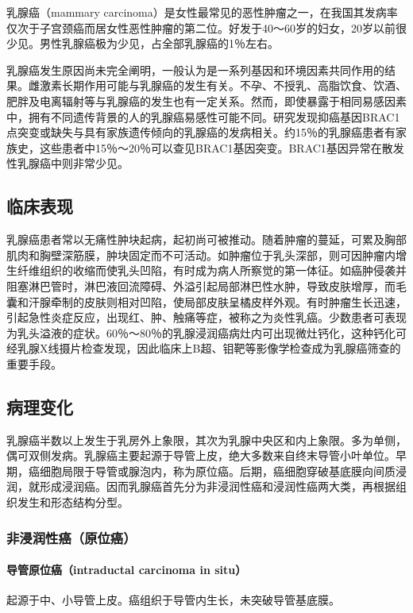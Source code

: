 乳腺癌（mammary
carcinoma）是女性最常见的恶性肿瘤之一，在我国其发病率仅次于子宫颈癌而居女性恶性肿瘤的第二位。好发于40～60岁的妇女，20岁以前很少见。男性乳腺癌极为少见，占全部乳腺癌的1％左右。

乳腺癌发生原因尚未完全阐明，一般认为是一系列基因和环境因素共同作用的结果。雌激素长期作用可能与乳腺癌的发生有关。不孕、不授乳、高脂饮食、饮酒、肥胖及电离辐射等与乳腺癌的发生也有一定关系。然而，即使暴露于相同易感因素中，拥有不同遗传背景的人的乳腺癌易感性可能不同。研究发现抑癌基因BRAC1点突变或缺失与具有家族遗传倾向的乳腺癌的发病相关。约15％的乳腺癌患者有家族史，这些患者中15％～20％可以查见BRAC1基因突变。BRAC1基因异常在散发性乳腺癌中则非常少见。

\subsection{临床表现}

乳腺癌患者常以无痛性肿块起病，起初尚可被推动。随着肿瘤的蔓延，可累及胸部肌肉和胸壁深筋膜，肿块固定而不可活动。如肿瘤位于乳头深部，则可因肿瘤内增生纤维组织的收缩而使乳头凹陷，有时成为病人所察觉的第一体征。如癌肿侵袭并阻塞淋巴管时，淋巴液回流障碍、外溢引起局部淋巴性水肿，导致皮肤增厚，而毛囊和汗腺牵制的皮肤则相对凹陷，使局部皮肤呈橘皮样外观。有时肿瘤生长迅速，引起急性炎症反应，出现红、肿、触痛等症，被称之为炎性乳癌。少数患者可表现为乳头溢液的症状。60％～80％的乳腺浸润癌病灶内可出现微灶钙化，这种钙化可经乳腺X线摄片检查发现，因此临床上B超、钼靶等影像学检查成为乳腺癌筛查的重要手段。

\subsection{病理变化}

乳腺癌半数以上发生于乳房外上象限，其次为乳腺中央区和内上象限。多为单侧，偶可双侧发病。乳腺癌主要起源于导管上皮，绝大多数来自终末导管小叶单位。早期，癌细胞局限于导管或腺泡内，称为原位癌。后期，癌细胞穿破基底膜向间质浸润，就形成浸润癌。因而乳腺癌首先分为非浸润性癌和浸润性癌两大类，再根据组织发生和形态结构分型。

\subsubsection{非浸润性癌（原位癌）}

\paragraph{导管原位癌（intraductal carcinoma in situ）}
起源于中、小导管上皮。癌组织于导管内生长，未突破导管基底膜。

